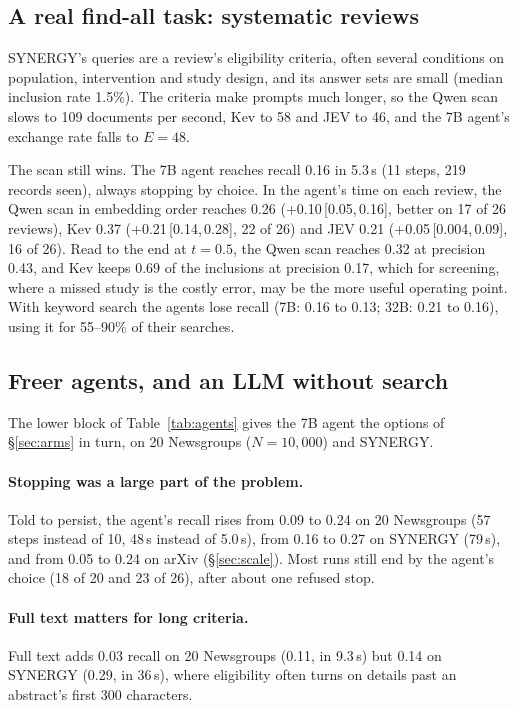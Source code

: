 \documentclass[11pt]{article}
\newcommand{\ci}[2]{\,[#1,\,#2]}
\begin{document}
\subsection{A real find-all task: systematic reviews}
\label{sec:synergy}

SYNERGY's queries are a review's eligibility criteria, often several
conditions on population, intervention and study design, and its answer sets
are small (median inclusion rate 1.5\%). The criteria make prompts much longer,
so the Qwen scan slows to 109 documents per second, Kev to 58 and
JEV to 46, and the 7B agent's exchange rate falls to $E=48$.

The scan still wins. The 7B agent reaches recall 0.16 in 5.3\,s (11 steps, 219
records seen), always stopping by choice. In the agent's time on each review,
the Qwen scan in embedding order reaches 0.26 (+0.10\ci{0.05}{0.16}, better on
17 of 26 reviews), Kev 0.37 (+0.21\ci{0.14}{0.28}, 22 of 26) and JEV 0.21
(+0.05\ci{0.004}{0.09}, 16 of 26). Read to the end at $t=0.5$, the Qwen scan
reaches 0.32 at precision 0.43, and Kev keeps 0.69 of the inclusions at precision
0.17, which for screening, where a missed study is the costly error, may be the
more useful operating point. With keyword search the agents lose recall (7B:
0.16 to 0.13; 32B: 0.21 to 0.16), using it for 55--90\% of their searches.

\subsection{Freer agents, and an LLM without search}
\label{sec:freer}

The lower block of Table~\ref{tab:agents} gives the 7B agent the options of
\S\ref{sec:arms} in turn, on 20 Newsgroups ($N=10{,}000$) and SYNERGY.

\paragraph{Stopping was a large part of the problem.}
Told to persist, the agent's recall rises from 0.09 to 0.24 on 20 Newsgroups
(57 steps instead of 10, 48\,s instead of 5.0\,s), from 0.16 to 0.27 on SYNERGY
(79\,s), and from 0.05 to 0.24 on arXiv (\S\ref{sec:scale}). Most runs still end
by the agent's choice (18 of 20 and 23 of 26), after about one refused stop.

\paragraph{Full text matters for long criteria.}
Full text adds 0.03 recall on 20 Newsgroups (0.11, in 9.3\,s) but 0.14 on SYNERGY
(0.29, in 36\,s), where eligibility often turns on details past an abstract's
first 300 characters.
\end{document}
